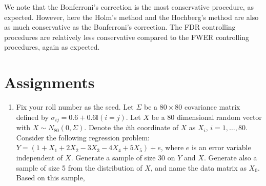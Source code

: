 \documentclass[
]{book}
\begin{document}
We note that the Bonferroni's correction is the most conservative procedure, as expected. However, here the Holm's method and the Hochberg's method are also as much conservative as the Bonferroni's correction. The FDR controlling procedures are relatively less conservative compared to the FWER controlling procedures, again as expected.

\hypertarget{assignments}{%
\chapter{Assignments}\label{assignments}}

\begin{enumerate}
\def\labelenumi{\arabic{enumi}.}
\item
  Fix your roll number as the seed. Let \(\Sigma\) be a \(80 \times 80\) covariance matrix defined by \(\sigma_{i j} = 0.6 + 0.6 \mathbb{I}(i = j)\). Let \(X\) be a \(80\) dimensional random vector with \(X \sim N_{80}( 0, \Sigma )\). Denote the \(i\)th coordinate of \(X\) as \(X_i\), \(i = 1, \ldots, 80\). Consider the following regression problem: \(Y = (1 + X_1 + 2 X_2 - 3 X_3 - 4 X_4 + 5 X_5) + e\), where \(e\) is an error variable independent of \(X\). Generate a sample of size \(30\) on \(Y\) and \(X\). Generate also a sample of size 5 from the distribution of \(X\), and name the data matrix as \(X_0\). Based on this sample,


\end{enumerate}
\end{document}
